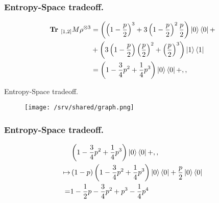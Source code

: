 \documentclass{beamer}
\begin{document}
\begin{frame}
  \frametitle{Entropy-Space tradeoff.}  
  \begin{equation*}
    \begin{split}
      \textbf{Tr }_{[1,2]}M\rho^{\otimes 3} &= \left( \left( 1 - \frac{p}{2} \right)^3 + 3 \left( 1 - \frac{p}{2} \right)^{2} \frac{p}{2} \right) \ket{0}\bra{0} +  \\ 
      &+ \left( 3\left( 1 - \frac{p}{2} \right)\left( \frac{p}{2} \right)^2 + \left( \frac{p}{2} \right)^{3} \right) \ket{1}\bra{1}\\
      &= \left( 1 - \frac{3}{4}p^2 + \frac{1}{4}p^{3} \right) \ket{0}\bra{0} + ,,
    \end{split}
  \end{equation*}
\end{frame}

\begin{frame}{Entropy-Space tradeoff.}
    \begin{figure}
        \centering
        \texttt{[image: /srv/shared/graph.png]}
    \end{figure}
\end{frame}

\begin{frame}
  \frametitle{Entropy-Space tradeoff.}

  \begin{equation*}
    \begin{split}
        & \left( 1 - \frac{3}{4}p^2 + \frac{1}{4}p^{3} \right) \ket{0}\bra{0} + ,, \\
        \mapsto & \left( 1 - p\right) \left( 1 - \frac{3}{4}p^2 + \frac{1}{4}p^{3} \right) \ket{0}\bra{0} + \frac{p}{2} \ket{0}\bra{0} \\ 
        = & 1 - \frac{1}{2}p - \frac{3}{4}p^{2} + p^3 - \frac{1}{4}p^{4}
    \end{split}
  \end{equation*}
\end{frame}
\end{document}
